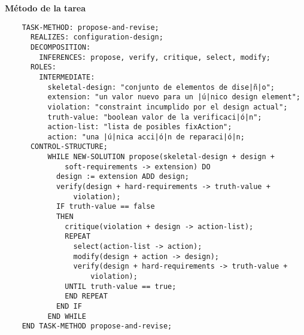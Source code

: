 \documentclass[12pt,a4paper,twoside,spanish]{article}      %
\begin{document}
\textbf {Método de la tarea}
\begin{lstlisting}
    TASK-METHOD: propose-and-revise;
      REALIZES: configuration-design;
      DECOMPOSITION:
        INFERENCES: propose, verify, critique, select, modify;
      ROLES:
        INTERMEDIATE:
          skeletal-design: "conjunto de elementos de dise|ñ|o";
          extension: "un valor nuevo para un |ú|nico design element";
          violation: "constraint incumplido por el design actual";
          truth-value: "boolean valor de la verificaci|ó|n";
          action-list: "lista de posibles fixAction";
          action: "una |ú|nica acci|ó|n de reparaci|ó|n;
      CONTROL-STRUCTURE;
          WHILE NEW-SOLUTION propose(skeletal-design + design +
              soft-requirements -> extension) DO
            design := extension ADD design;
            verify(design + hard-requirements -> truth-value +
                violation);
            IF truth-value == false
            THEN
              critique(violation + design -> action-list);
              REPEAT
                select(action-list -> action);
                modify(design + action -> design);
                verify(design + hard-requirements -> truth-value +
                    violation);
              UNTIL truth-value == true;
              END REPEAT
            END IF
          END WHILE
    END TASK-METHOD propose-and-revise;
\end{lstlisting}

\end{document}
